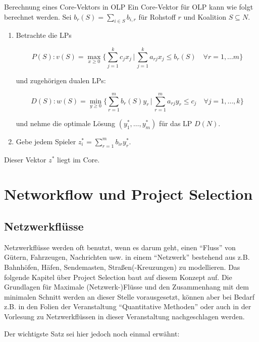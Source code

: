 \documentclass{panikzettel}
\begin{document}
\begin{defi}{Berechnung eines Core-Vektors in OLP}
	Ein Core-Vektor für OLP kann wie folgt berechnet werden. Sei $b_r(S) = \sum_{i \in S} b_{i,r}$ für Rohstoff $r$ und Koalition $S \subseteq N$.
	
	\begin{enumerate}
		\item Betrachte die LPs
		
		\[P(S) :  v(S) = \max_{x \geq 0}\{\sum_{j=1}^{k} c_j x_j \, | \, \sum_{j=1}^{k} a_{rj} x_j \leq b_r(S) \quad \forall r = 1, \dots m \} \]
		
		und zugehörigen dualen LPs:
		
		\[D(S) :  w(S) = \min_{y \geq 0}\{\sum_{r=1}^{m} b_r(S) y_r \, | \, \sum_{r=1}^{m} a_{rj} y_r \leq c_j \quad \forall j = 1, \dots ,k \} \]
		
		und nehme die optimale Lösung $(y_1^*, \dots , y_m^*)$ für das LP $D(N)$.
		
		\hspace{0.1cm}
		\item Gebe jedem Spieler $z_i^* = \sum_{r=1}^{m} b_{ir} y_r^*$.
	\end{enumerate}
	
	Dieser Vektor $z^*$ liegt im Core.
\end{defi}


\section{Networkflow und Project Selection}

\subsection{Netzwerkflüsse}

Netzwerkflüsse werden oft benutzt, wenn es darum geht, einen ``Fluss'' von Gütern, Fahrzeugen, Nachrichten usw. in einem ``Netzwerk'' bestehend aus z.B. Bahnhöfen, Häfen, Sendemasten, Straßen(-Kreuzungen) zu modellieren. Das folgende Kapitel über Project Selection baut auf diesem Konzept auf. Die Grundlagen für Maximale (Netzwerk-)Flüsse und den Zusammenhang mit dem minimalen Schnitt werden an dieser Stelle vorausgesetzt, können aber bei Bedarf z.B. in den Folien der Veranstaltung ``Quantitative Methoden'' oder auch in der Vorlesung zu Netzwerkflüssen in dieser Veranstaltung nachgeschlagen werden.

Der wichtigste Satz sei hier jedoch noch einmal erwähnt:
\end{document}

